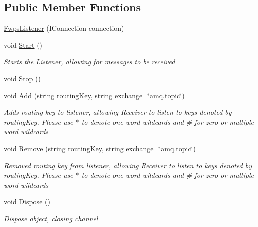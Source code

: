 \subsection*{Public Member Functions}
\begin{DoxyCompactItemize}
\item 
\mbox{\hyperlink{class_master_application_1_1_threads_1_1_fwps_listener_adf0a8a6efaa73852384016f2bdef71eb}{Fwps\+Listener}} (I\+Connection connection)
\item 
void \mbox{\hyperlink{class_master_application_1_1_threads_1_1_fwps_listener_abb282c4f8d463224c65582c91dd1a5bb}{Start}} ()
\begin{DoxyCompactList}\small\item\em Starts the Listener, allowing for messages to be received \end{DoxyCompactList}\item 
void \mbox{\hyperlink{class_master_application_1_1_threads_1_1_fwps_listener_a590df6f1cf3d72935ba0aa2e26ed6174}{Stop}} ()
\item 
void \mbox{\hyperlink{class_master_application_1_1_threads_1_1_fwps_listener_ae19201bd86b5f5d21b6d140794ecbdbc}{Add}} (string routing\+Key, string exchange=\char`\"{}amq.\+topic\char`\"{})
\begin{DoxyCompactList}\small\item\em Adds routing key to listener, allowing Receiver to listen to keys denoted by \textquotesingle{}routing\+Key\textquotesingle{}. Please use \textquotesingle{}$\ast$\textquotesingle{} to denote one word wildcards and \textquotesingle{}\#\textquotesingle{} for zero or multiple word wildcards \end{DoxyCompactList}\item 
void \mbox{\hyperlink{class_master_application_1_1_threads_1_1_fwps_listener_aee12307bd200ca163ed2d536db60b0bc}{Remove}} (string routing\+Key, string exchange=\char`\"{}amq.\+topic\char`\"{})
\begin{DoxyCompactList}\small\item\em Removed routing key from listener, allowing Receiver to listen to keys denoted by \textquotesingle{}routing\+Key\textquotesingle{}. Please use \textquotesingle{}$\ast$\textquotesingle{} to denote one word wildcards and \textquotesingle{}\#\textquotesingle{} for zero or multiple word wildcards \end{DoxyCompactList}\item 
void \mbox{\hyperlink{class_master_application_1_1_threads_1_1_fwps_listener_a7252861b396fe8ee18e4c183596e4696}{Dispose}} ()
\begin{DoxyCompactList}\small\item\em Dispose object, closing channel \end{DoxyCompactList}\end{DoxyCompactItemize}
